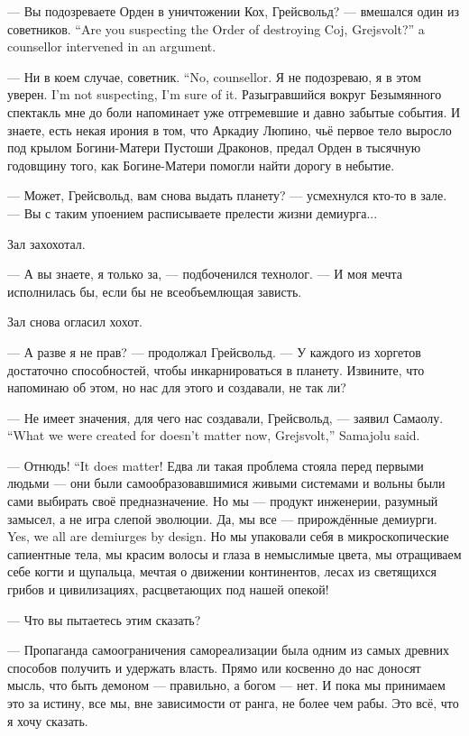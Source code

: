 {--- Вы подозреваете Орден в уничтожении Кох, Грейсвольд? --- вмешался один из советников.}
{``Are you suspecting the Order of destroying Coj, Grejsvolt?'' a counsellor intervened in an argument.}

{--- Ни в коем случае, советник.}
{``No, counsellor.}
{Я не подозреваю, я в этом уверен.}
{I'm not suspecting, I'm sure of it.}
Разыгравшийся вокруг Безымянного спектакль мне до боли напоминает уже отгремевшие и давно забытые события.
И знаете, есть некая ирония в том, что Аркадиу Люпино, чьё первое тело выросло под крылом Богини-Матери Пустоши Драконов, предал Орден в тысячную годовщину того, как Богине-Матери помогли найти дорогу в небытие.

--- Может, Грейсвольд, вам снова выдать планету? --- усмехнулся кто-то в зале.
--- Вы с таким упоением расписываете прелести жизни демиурга...

Зал захохотал.

--- А вы знаете, я только за, --- подбоченился технолог.
--- И моя мечта исполнилась бы, если бы не всеобъемлющая зависть.

Зал снова огласил хохот.

--- А разве я не прав? --- продолжал Грейсвольд.
--- У каждого из хоргетов достаточно способностей, чтобы инкарнироваться в планету.
Извините, что напоминаю об этом, но нас для этого и создавали, не так ли?

{--- Не имеет значения, для чего нас создавали, Грейсвольд, --- заявил Самаолу.}
{``What we were created for doesn't matter now, Grejsvolt,'' Samajolu said.}

{--- Отнюдь!}
{``It does matter!}
Едва ли такая проблема стояла перед первыми людьми --- они были самообразовавшимися живыми системами и вольны были сами выбирать своё предназначение.
Но мы --- продукт инженерии, разумный замысел, а не игра слепой эволюции.
{Да, мы все --- прирождённые демиурги.}
{Yes, we all are demiurges by design.}
Но мы упаковали себя в микроскопические сапиентные тела, мы красим волосы и глаза в немыслимые цвета, мы отращиваем себе когти и щупальца, мечтая о движении континентов, лесах из светящихся грибов и цивилизациях, расцветающих под нашей опекой!

--- Что вы пытаетесь этим сказать?

--- Пропаганда самоограничения самореализации была одним из самых древних способов получить и удержать власть.
Прямо или косвенно до нас доносят мысль, что быть демоном --- правильно, а богом --- нет.
И пока мы принимаем это за истину, все мы, вне зависимости от ранга, не более чем рабы.
Это всё, что я хочу сказать.

